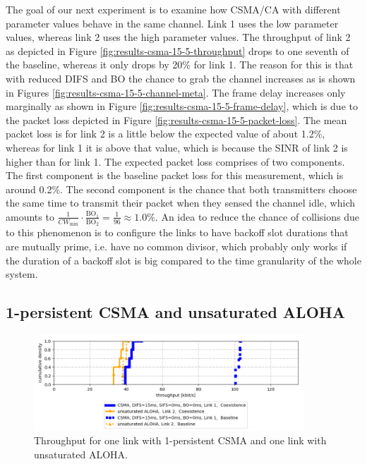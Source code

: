 The goal of our next experiment is to examine how CSMA/CA with different parameter values behave in the same channel. Link 1 uses the low parameter values, whereas link 2 uses the high parameter values. The throughput of link 2 as depicted in Figure \ref{fig:results-csma-15-5-throughput} drops to one seventh of the baseline, whereas it only drops by 20\% for link 1. The reason for this is that with reduced DIFS and BO the chance to grab the channel increases as is shown in Figures \ref{fig:results-csma-15-5-channel-meta}. The frame delay increases only marginally as shown in Figure \ref{fig:results-csma-15-5-frame-delay}, which is due to the packet loss depicted in Figure \ref{fig:results-csma-15-5-packet-loss}. The mean packet loss is for link 2 is a little below the expected value of about 1.2\%, whereas for link 1 it is above that value, which is because the SINR of link 2 is higher than for link 1. The expected packet loss comprises of two components. The first component is the baseline packet loss for this measurement, which is around 0.2\%. The second component is the chance that both transmitters choose the same time to transmit their packet when they sensed the channel idle, which amounts to $ \frac{1}{CW_\text{min}} \cdot \frac{\text{BO}_1}{\text{BO}_2} = \frac{1}{96} \approx 1.0\% $. An idea to reduce the chance of collisions due to this phenomenon is to configure the links to have backoff slot durations that are mutually prime, i.e. have no common divisor, which probably only works if the duration of a backoff slot is big compared to the time granularity of the whole system. 

\clearpage

\subsection{1-persistent CSMA and unsaturated ALOHA}

\begin{figure}[tb]
	\label{fig:results-difs-only-aloha-throughput}
	\begin{center}
		\includegraphics[width=0.9\textwidth]{pictures/results/different_combinations/difs_only_aloha/throughput_cdf}
	\end{center}
	\caption{Throughput for one link with 1-persistent CSMA and one link with unsaturated ALOHA.}
\end{figure}

